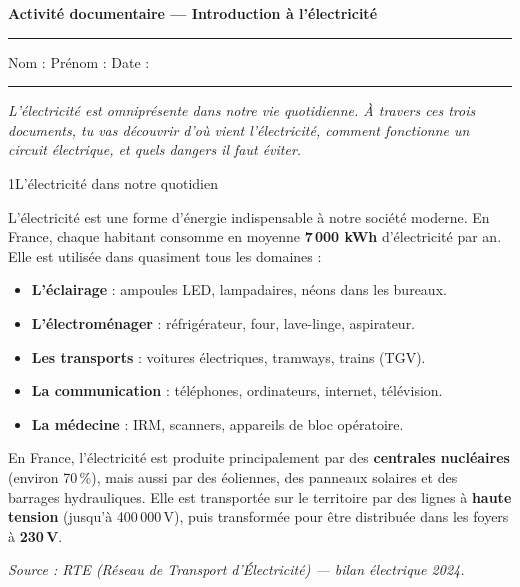 \documentclass[11pt,a4paper]{article}
\begin{document}
\begin{center}
  {\LARGE\textbf{Activité documentaire --- Introduction à l'électricité}}
\end{center}

\hrule
\vspace{3mm}
\noindent Nom : \dotfill \quad Prénom : \dotfill \quad Date : \dotfill
\vspace{3mm}
\hrule
\vspace{5mm}

\begin{center}
  \textit{L'électricité est omniprésente dans notre vie quotidienne. À travers ces trois documents, tu vas découvrir d'où vient l'électricité, comment fonctionne un circuit électrique, et quels dangers il faut éviter.}
\end{center}

\vspace{5mm}


\begin{docdoc}{1}{L'électricité dans notre quotidien}

L'électricité est une forme d'énergie indispensable à notre société moderne. En France, chaque habitant consomme en moyenne \textbf{7\,000 kWh} d'électricité par an. Elle est utilisée dans quasiment tous les domaines :

\begin{itemize}
  \item \textbf{L'éclairage} : ampoules LED, lampadaires, néons dans les bureaux.
  \item \textbf{L'électroménager} : réfrigérateur, four, lave-linge, aspirateur.
  \item \textbf{Les transports} : voitures électriques, tramways, trains (TGV).
  \item \textbf{La communication} : téléphones, ordinateurs, internet, télévision.
  \item \textbf{La médecine} : IRM, scanners, appareils de bloc opératoire.
\end{itemize}

En France, l'électricité est produite principalement par des \textbf{centrales nucléaires} (environ 70\,\%), mais aussi par des éoliennes, des panneaux solaires et des barrages hydrauliques. Elle est transportée sur le territoire par des lignes à \textbf{haute tension} (jusqu'à 400\,000\,V), puis transformée pour être distribuée dans les foyers à \textbf{230\,V}.

\vspace{2mm}
\footnotesize\textit{Source : RTE (Réseau de Transport d'Électricité) --- bilan électrique 2024.}
\normalsize
\end{docdoc}
\end{document}
